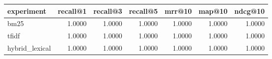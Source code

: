 \begin{tabular}{lrrrrrr}
\toprule
experiment & recall@1 & recall@3 & recall@5 & mrr@10 & map@10 & ndcg@10 \\
\midrule
bm25 & 1.0000 & 1.0000 & 1.0000 & 1.0000 & 1.0000 & 1.0000 \\
tfidf & 1.0000 & 1.0000 & 1.0000 & 1.0000 & 1.0000 & 1.0000 \\
hybrid_lexical & 1.0000 & 1.0000 & 1.0000 & 1.0000 & 1.0000 & 1.0000 \\
\bottomrule
\end{tabular}
